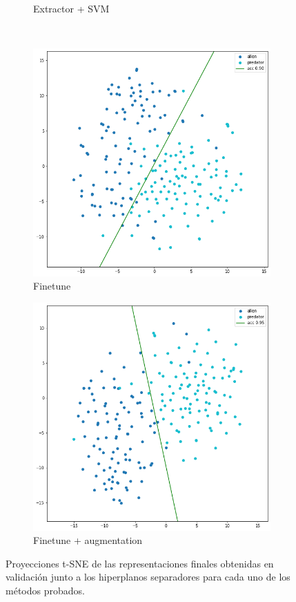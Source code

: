 \documentclass[11pt]{article}
\begin{document}
\begin{figure}[h!]
\begin{subfigure}[b]{0.49\textwidth}
         \caption{Extractor + SVM}
     \end{subfigure}
     \\
     \begin{subfigure}[b]{0.49\textwidth}
         \centering
         \includegraphics[width=\textwidth]{img/3_tsne_finetune}
         \caption{Finetune}
     \end{subfigure}
     \hfill
     \begin{subfigure}[b]{0.49\textwidth}
         \centering
         \includegraphics[width=\textwidth]{img/3_tsne_augmentation}
         \caption{Finetune + augmentation}
     \end{subfigure}
        \caption{Proyecciones t-SNE de las representaciones finales obtenidas en validación junto a los hiperplanos separadores para cada uno de los métodos probados.}
        \label{fig:3_tsne}
\end{figure}
\end{document}

